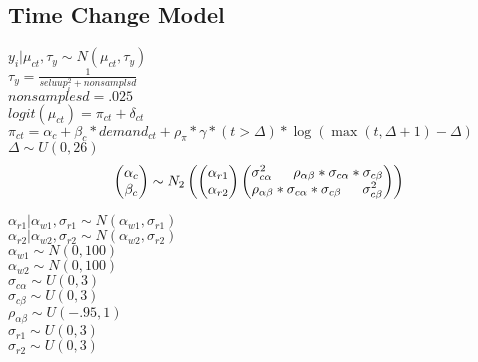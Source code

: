\documentclass[12pt]{article}
\begin{document}
\subsection{Time Change Model}
 $ y_i|\mu_{ct},\tau_y \sim N(\mu_{ct}, \tau_y) $ \\
 $ \tau_y = \frac{1}{seluup^2_i + nonsamplsd} $ \\
 $ nonsamplesd = .025 $ \\
 $ logit(\mu_{ct})=  \pi_{ct} + \delta_{ct} $\\
 $ \pi_{ct} = \alpha_c + \beta_c*demand_{ct} + \rho_{\pi}*\gamma*(t > \Delta)* \log(\max(t, \Delta+1)-\Delta)$ \\
 $ \Delta \sim U(0,26) $ \\
\begin{equation*}
  \begin{pmatrix}
  	\alpha_c \\
  	\beta_c 
  \end{pmatrix}
  \sim N_2
  \begin{pmatrix}
  	\begin{pmatrix}
    	\alpha_{r1} \\
    	\alpha_{r2}
  	\end{pmatrix}
  	\begin{pmatrix}
    	\sigma^2_{c\alpha}  $\indent$  \rho_{\alpha\beta}*\sigma_{c\alpha}*\sigma_{c\beta} \\
    	\rho_{\alpha\beta}*\sigma_{c\alpha}*\sigma_{c\beta} $\indent$ \sigma^2_{c\beta}
  	\end{pmatrix} 
  \end{pmatrix} \\
\end{equation*}

\noindent
 $ \alpha_{r1}|\alpha_{w1},\sigma_{r1} \sim N(\alpha_{w1},\sigma_{r1}) $ \\
 $ \alpha_{r2}|\alpha_{w2},\sigma_{r2} \sim N(\alpha_{w2},\sigma_{r2}) $ \\
 $ \alpha_{w1} \sim N(0,100) $ \\
 $ \alpha_{w2} \sim N(0,100) $ \\

\noindent
 $\sigma_{c\alpha} \sim U(0,3) $ \\
 $\sigma_{c\beta} \sim U(0,3) $\\
 $\rho_{\alpha\beta} \sim U(-.95,1)$ \\
 $ \sigma_{r1} \sim U(0,3) $\\
 $ \sigma_{r2} \sim U(0,3) $\\
\end{document}
